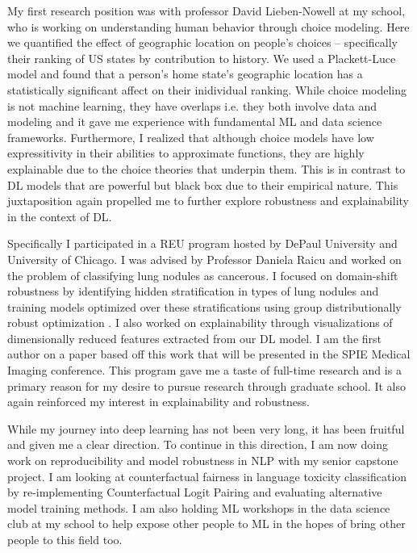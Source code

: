 \documentclass[12pt]{article}
\begin{document}
My first research position was with professor David Lieben-Nowell at my school, who is working on understanding human behavior through choice modeling. Here we quantified the effect of geographic location on people's choices -- specifically their ranking of US states by contribution to history. We used a Plackett-Luce model and found that a person's home state's geographic location has a statistically significant affect on their inidividual ranking.
While choice modeling is not machine learning, they have overlaps i.e. they both involve data and modeling and it gave me experience with fundamental ML and data science frameworks. 
Furthermore, I realized that although choice models have low expressitivity in their abilities to approximate functions, they are highly explainable due to the choice theories that underpin them. This is in contrast to DL models that are powerful but black box due to their empirical nature. This juxtaposition again propelled me to further explore robustness and explainability in the context of DL.

 Specifically I participated in a REU program hosted by DePaul University and University of Chicago. I was advised by Professor Daniela Raicu and worked on the problem of classifying lung nodules as cancerous. I focused on domain-shift robustness by identifying hidden stratification in types of lung nodules and training models optimized over these stratifications using group distributionally robust optimization \cite{Sagawa*2020Distributionally}. I also worked on explainability through visualizations of dimensionally reduced features extracted from our DL model. I am the first author on a paper based off this work that will be presented in the SPIE Medical Imaging conference. This program gave me a taste of full-time research and is a primary reason for my desire to pursue research through graduate school.
It also again reinforced my interest in explainability and robustness. 
 
While my journey into deep learning has not been very long, it has been fruitful and given me a clear direction.
To continue in this direction, I am now doing work on reproducibility and model robustness in NLP with my senior capstone project. I am looking at counterfactual fairness in language toxicity classification by re-implementing Counterfactual Logit Pairing \cite{garg2019counterfactual} and evaluating alternative model training methods. I am also holding ML workshops in the data science club at my school to help expose other people to ML in the hopes of bring other people to this field too.
\end{document}

